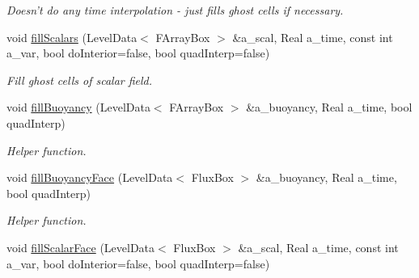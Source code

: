 \begin{DoxyCompactItemize}
\begin{DoxyCompactList}\small\item\em Doesn't do any time interpolation -\/ just fills ghost cells if necessary. \end{DoxyCompactList}\item 
\hypertarget{class_a_m_r_level_mushy_layer_aebd51c6e4d51d6459c089771f958a30e}{void \hyperlink{class_a_m_r_level_mushy_layer_aebd51c6e4d51d6459c089771f958a30e}{fill\-Scalars} (Level\-Data$<$ F\-Array\-Box $>$ \&a\-\_\-scal, Real a\-\_\-time, const int a\-\_\-var, bool do\-Interior=false, bool quad\-Interp=false)}\label{class_a_m_r_level_mushy_layer_aebd51c6e4d51d6459c089771f958a30e}

\begin{DoxyCompactList}\small\item\em Fill ghost cells of scalar field. \end{DoxyCompactList}\item 
\hypertarget{class_a_m_r_level_mushy_layer_a0d83bb04c2d1d070bfaf5ee68d9fbb8e}{void \hyperlink{class_a_m_r_level_mushy_layer_a0d83bb04c2d1d070bfaf5ee68d9fbb8e}{fill\-Buoyancy} (Level\-Data$<$ F\-Array\-Box $>$ \&a\-\_\-buoyancy, Real a\-\_\-time, bool quad\-Interp)}\label{class_a_m_r_level_mushy_layer_a0d83bb04c2d1d070bfaf5ee68d9fbb8e}

\begin{DoxyCompactList}\small\item\em Helper function. \end{DoxyCompactList}\item 
\hypertarget{class_a_m_r_level_mushy_layer_a88670451228818765118f873401b7810}{void \hyperlink{class_a_m_r_level_mushy_layer_a88670451228818765118f873401b7810}{fill\-Buoyancy\-Face} (Level\-Data$<$ Flux\-Box $>$ \&a\-\_\-buoyancy, Real a\-\_\-time, bool quad\-Interp)}\label{class_a_m_r_level_mushy_layer_a88670451228818765118f873401b7810}

\begin{DoxyCompactList}\small\item\em Helper function. \end{DoxyCompactList}\item 
\hypertarget{class_a_m_r_level_mushy_layer_a1b8c487cd378d7aa409a59ecc18a1e66}{void \hyperlink{class_a_m_r_level_mushy_layer_a1b8c487cd378d7aa409a59ecc18a1e66}{fill\-Scalar\-Face} (Level\-Data$<$ Flux\-Box $>$ \&a\-\_\-scal, Real a\-\_\-time, const int a\-\_\-var, bool do\-Interior=false, bool quad\-Interp=false)}\label{class_a_m_r_level_mushy_layer_a1b8c487cd378d7aa409a59ecc18a1e66}


\end{DoxyCompactItemize}
